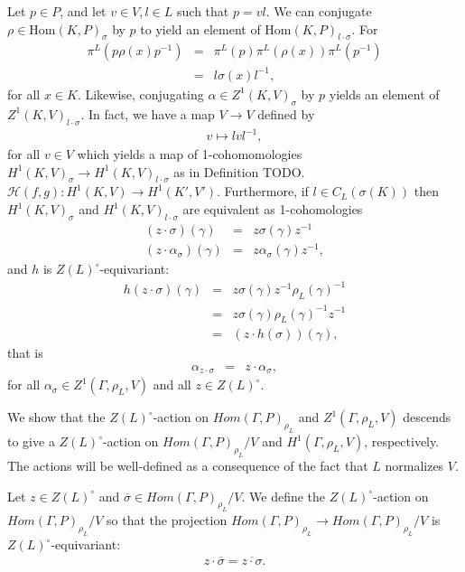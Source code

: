 Let $p \in P$, and let $v \in V, l \in L$ such that $p = vl$. We can conjugate $\rho \in \mathrm{Hom}(K, P)_\sigma$ by $p$ to yield an element of $\mathrm{Hom}(K, P)_{l \cdot \sigma}$. For
\begin{eqnarray*}%
\pi^L\left(p \rho(x) p^{-1}\right)%
&=& \pi^L\left(p\right) \pi^L\left(\rho(x)\right) \pi^L\left(p^{-1}\right) \\
&=& l \sigma(x) l^{-1},
\end{eqnarray*}
for all $x \in K$. Likewise, conjugating $\alpha \in Z^1(K, V)_\sigma$ by $p$ yields an element of $Z^1(K, V)_{l \cdot \sigma}$. In fact, we have a map $V \rightarrow V$ defined by
\begin{eqnarray*} v \mapsto lvl^{-1}, \end{eqnarray*}
for all $v \in V$ which yields a map of 1-cohomomologies $H^1(K, V)_\sigma \rightarrow H^1(K, V)_{l \cdot \sigma}$ as in Definition TODO.
$\mathcal{H}(f, g):H^1(K, V) \rightarrow H^1(K', V')$.
Furthermore, if $l \in C_L\left(\sigma(K)\right)$ then $H^1(K, V)_\sigma$ and $H^1(K, V)_{l \cdot \sigma}$ are equivalent as 1-cohomologies
\begin{eqnarray*}
  (z \cdot \sigma) (\gamma) &=& z \sigma(\gamma) z^{-1} \\
  (z \cdot \alpha_\sigma) (\gamma) &=&  z \alpha_\sigma(\gamma) z^{-1},
\end{eqnarray*}
and $h$ is $Z(L)^\circ$-equivariant:
\begin{eqnarray*}
  h(z \cdot \sigma)(\gamma) &=&  z \sigma(\gamma) z^{-1} \rho_L(\gamma)^{-1} \\
  &=& z \sigma(\gamma) \rho_L(\gamma)^{-1} z^{-1} \\
  &=& (z \cdot h(\sigma))(\gamma),
\end{eqnarray*}
that is
\begin{eqnarray}
  \alpha_{z \cdot \sigma} &=& z \cdot \alpha_\sigma,
  \label{eqn:h_z_equivar}
\end{eqnarray}
for all $\alpha_\sigma \in Z^1(\Gamma, \rho_L, V)$ and all $z \in Z(L)^\circ$.

We show that the $Z(L)^\circ$-action on $Hom(\Gamma, P)_{\rho_L}$ and $Z^1(\Gamma, \rho_L, V)$ descends to give a $Z(L)^\circ$-action on $Hom(\Gamma, P)_{\rho_L}/V$ and $H^1(\Gamma, \rho_L, V)$, respectively. The actions will be well-defined as a consequence of the fact that $L$ normalizes $V$.

Let $z \in Z(L)^\circ$ and $\overline{\sigma} \in Hom(\Gamma, P)_{\rho_L}/V$. We define the $Z(L)^\circ$-action on $Hom(\Gamma, P)_{\rho_L}/V$ so that the projection $Hom(\Gamma, P)_{\rho_L} \rightarrow Hom(\Gamma, P)_{\rho_L}/V$ is $Z(L)^\circ$-equivariant:
\begin{eqnarray}
  z \cdot \overline{\sigma} = \overline{z \cdot \sigma}.
  \label{eqn:z_act_rv}
\end{eqnarray}

